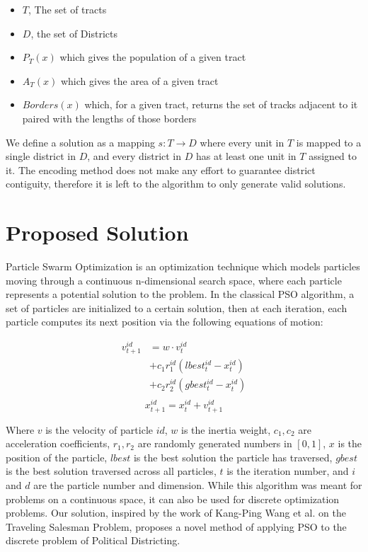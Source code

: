 \documentclass[journal]{IEEEtran}
\begin{document}
\begin{itemize}
\item $T$, The set of tracts
\item $D$, the set of Districts
\item $P_T(x)$ which gives the population of a given tract
\item $A_T(x)$ which gives the area of a given tract
\item $Borders(x)$ which, for a given tract, returns the set of tracks adjacent to it paired with the lengths of those borders
\end{itemize}

We define a solution as a mapping $s: T \rightarrow D$ where every unit in $T$
is mapped to a single district in $D$, and every district in $D$ has at least
one unit in $T$ assigned to it.  The encoding method does not make any effort to
guarantee district contiguity, therefore it is left to the algorithm to only
generate valid solutions.

\section{Proposed Solution}
\label{sec:proposed_solution}
Particle Swarm Optimization is an optimization technique which models particles
moving through a continuous n-dimensional search space, where each particle
represents a potential solution to the problem.  In the classical PSO algorithm,
a set of particles are initialized to a certain solution, then at each
iteration, each particle computes its next position via the following equations
of motion:

\begin{equation}
\label{vel-update-eqn-classic}
\begin{aligned}
v_{t + 1}^{id} &= w \cdot v_t^{id}\\
&+ c_1r_1^{id}(lbest_t^{id} - x_t^{id})\\
&+ c_2r_2^{id}(gbest_t^{id} - x_t^{id})\\
\end{aligned}
\end{equation}
\begin{equation}
\label{pos-update-eqn-classic}
x_{t + 1}^{id} = x_t^{id} + v_{t + 1}^{id}
\end{equation}

Where $v$ is the velocity of particle $id$, $w$ is the inertia weight, $c_1,
c_2$ are acceleration coefficients, $r_1, r_2$ are randomly generated numbers in
$[0, 1]$, $x$ is the position of the particle, $lbest$ is the best solution the
particle has traversed, $gbest$ is the best solution traversed across all
particles, $t$ is the iteration number, and $i$ and $d$ are the particle number
and dimension.  While this algorithm was meant for problems on a continuous
space, it can also be used for discrete optimization problems.  Our solution,
inspired by the work of Kang-Ping Wang et al. \cite{tsp-pso} on the Traveling
Salesman Problem, proposes a novel method of applying PSO to the discrete
problem of Political Districting.
\end{document}

